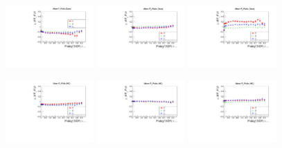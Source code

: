 \begin{figure}[tbp]
\begin{center}          \includegraphics[width=0.3\textwidth]{figures/gluex_nim_pullspx_pulls_mean_data.pdf}
\includegraphics[width=0.3\textwidth]{figures/gluex_nim_pullspy_pulls_mean_data.pdf}
\includegraphics[width=0.3\textwidth]{figures/gluex_nim_pullspz_pulls_mean_data.pdf}

\includegraphics[width=0.3\textwidth]{figures/gluex_nim_pullspx_pulls_mean_mc.pdf}
\includegraphics[width=0.3\textwidth]{figures/gluex_nim_pullspy_pulls_mean_mc.pdf}
\includegraphics[width=0.3\textwidth]{figures/gluex_nim_pullspz_pulls_mean_mc.pdf}


\end{center}
\end{figure}
